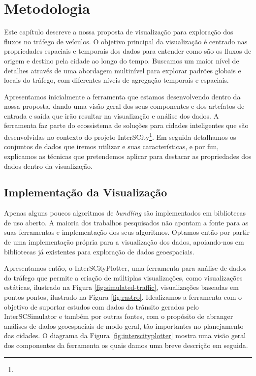 \chapter{Metodologia}
\label{cap:metodologia}
 Este capítulo descreve a nossa proposta de visualização para exploração dos
fluxos no tráfego de veículos. O objetivo principal da visualização é centrado
nas propriedades espaciais e temporais dos dados para entender como são os
fluxos de origem e destino pela cidade ao longo do tempo. Buscamos um maior
nível de detalhes através de uma abordagem multinível para explorar padrões
globais e locais do tráfego, com diferentes níveis de agregação temporais e
espaciais.

 Apresentamos inicialmente a ferramenta que estamos desenvolvendo dentro da
nossa proposta, dando uma visão geral dos seus componentes e dos artefatos de
entrada e saída que irão resultar na visualização e análise dos dados. A
ferramenta faz parte do ecossistema de soluções para cidades inteligentes que
são desenvolvidas no contexto do projeto InterSCity\footnote{}. Em seguida detalhamos os
conjuntos de dados que iremos utilizar e suas características, e por fim,
explicamos as técnicas que pretendemos aplicar para destacar as propriedades
dos dados dentro da visualização.

\section{Implementação da Visualização}
  Apenas alguns poucos algoritmos de \emph{bundling} são implementados em
bibliotecas de uso aberto. A maioria dos trabalhos pesquisados não apontam
a fonte para as suas ferramentas e implementação dos seus algoritmos. Optamos
então por partir de uma implementação própria para a visualização dos dados,
apoiando-nos em bibliotecas já existentes para exploração de dados geoespaciais.

  Apresentamos então, o InterSCityPlotter, uma ferramenta para análise de dados
do tráfego que permite a criação de múltiplas visualizações, como visualizações
estáticas, ilustrado na Figura \ref{fig:simulated-traffic}, visualizações
baseadas em pontos pontos, ilustrado na Figura \ref{fig:rastro}. Idealizamos a
ferramenta com o objetivo de suportar estudos com dados do trânsito gerados
pelo InterSCSimulator e também por outras fontes, com o propósito de abranger
análises de dados geoespaciais de modo geral, tão importantes no planejamento
das cidades. O diagrama da Figura \ref{fig:interscityplotter} mostra uma visão
geral dos componentes da ferramenta os quais damos uma breve descrição em
seguida.

